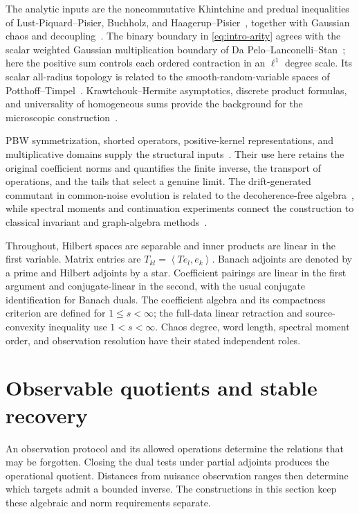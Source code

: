 \documentclass[11pt,a4paper]{amsart}
\numberwithin{equation}{section}
\theoremstyle{definition}
\theoremstyle{remark}
\newcommand{\ip}[2]{\left\langle#1,#2\right\rangle}
\begin{document}
The analytic inputs are the noncommutative Khintchine and predual inequalities of Lust-Piquard--Pisier, Buchholz, and Haagerup--Pisier~\cite{LP,Buchholz,HP}, together with Gaussian chaos and decoupling~\cite{Janson,Maas}. The binary boundary in \eqref{eq:intro-arity} agrees with the scalar weighted Gaussian multiplication boundary of Da Pelo--Lanconelli--Stan~\cite{DPLS}; here the positive sum controls each ordered contraction in an $\ell^1$ degree scale. Its scalar all-radius topology is related to the smooth-random-variable spaces of Potthoff--Timpel~\cite{PT}. Krawtchouk--Hermite asymptotics, discrete product formulas, and universality of homogeneous sums provide the background for the microscopic construction~\cite{Min,NPRR,NPR}.

PBW symmetrization, shorted operators, positive-kernel representations, and multiplicative domains supply the structural inputs~\cite{CP,AT,Ando,Stinespring,Choi,CJK}. Their use here retains the original coefficient norms and quantifies the finite inverse, the transport of operations, and the tails that select a genuine limit. The drift-generated commutant in common-noise evolution is related to the decoherence-free algebra~\cite{DFSU}, while spectral moments and continuation experiments connect the construction to classical invariant and graph-algebra methods~\cite{KongValiant,Lovasz}.

Throughout, Hilbert spaces are separable and inner products are linear in the first variable. Matrix entries are $T_{kl}=\ip{Te_l}{e_k}$. Banach adjoints are denoted by a prime and Hilbert adjoints by a star. Coefficient pairings are linear in the first argument and conjugate-linear in the second, with the usual conjugate identification for Banach duals. The coefficient algebra and its compactness criterion are defined for $1\le s<\infty$; the full-data linear retraction and source-convexity inequality use $1<s<\infty$. Chaos degree, word length, spectral moment order, and observation resolution have their stated independent roles.

\section{Observable quotients and stable recovery}\label{sec:principle}\label{sec:targetquotients}
An observation protocol and its allowed operations determine the relations that may be forgotten. Closing the dual tests under partial adjoints produces the operational quotient. Distances from nuisance observation ranges then determine which targets admit a bounded inverse. The constructions in this section keep these algebraic and norm requirements separate.
\end{document}
